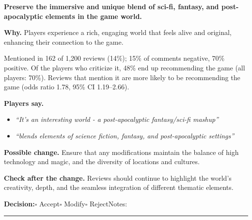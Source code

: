 \documentclass[10pt]{article}
\begin{document}
\begin{tcolorbox}[colback=white,colframe=gP,colbacktitle=lP,coltitle=black,title={\textbf{P2}\quad World Building\hfill\textcolor{gP}{\textbf{Protect}}},boxrule=0.8pt,arc=2pt,left=6pt,right=6pt,top=4pt,bottom=4pt,before skip=8pt,after skip=8pt]
{\large\textbf{Preserve the immersive and unique blend of sci-fi, fantasy, and post-apocalyptic elements in the game world.}}

\smallskip
\textbf{Why.} Players experience a rich, engaging world that feels alive and original, enhancing their connection to the game.

\smallskip
{\small Mentioned in 162 of 1,200 reviews (14\%); 15\% of comments negative, 70\% positive. Of the players who criticize it, 48\% end up recommending the game (all players: 70\%). Reviews that mention it are more likely to be recommending the game {\color{ink2}\footnotesize(odds ratio 1.78, 95\% CI 1.19--2.66)}.}

\smallskip
\textbf{Players say.}
\begin{itemize}[leftmargin=12pt,itemsep=1pt,topsep=2pt]
    \item \textit{``It's an interesting world - a post-apocalyptic fantasy/sci-fi mashup''}
    \item \textit{``blends elements of science fiction, fantasy, and post-apocalyptic settings''}
\end{itemize}
\textbf{Possible change.} Ensure that any modifications maintain the balance of high technology and magic, and the diversity of locations and cultures.

\smallskip
\textbf{Check after the change.} Reviews should continue to highlight the world's creativity, depth, and the seamless integration of different thematic elements.

\medskip
{\small\textbf{Decision:}\quad $\square$ Accept\quad $\square$ Modify\quad $\square$ Reject\qquad Notes: \rule{0.38\linewidth}{0.4pt}}
\end{tcolorbox}
\end{document}
